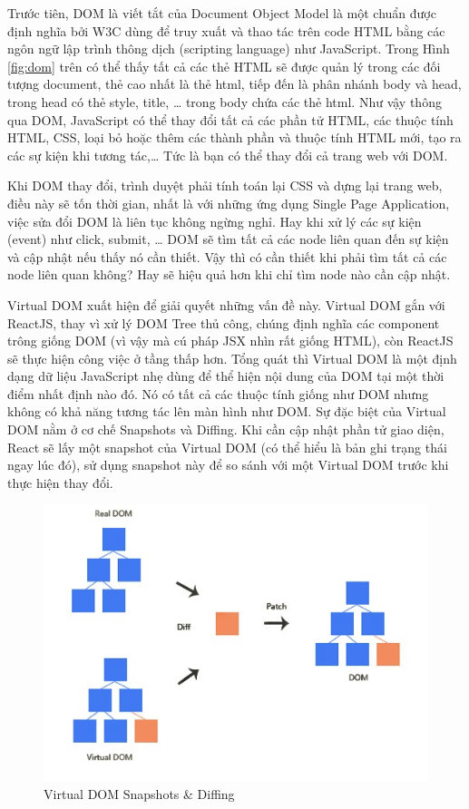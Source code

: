 Trước tiên, DOM là viết tắt của Document Object Model là
một chuẩn được định nghĩa bởi W3C dùng để truy xuất và thao
tác trên code HTML bằng các ngôn ngữ lập trình thông dịch
(scripting language) như JavaScript.
Trong Hình \ref{fig:dom}
trên có thể thấy tất cả các thẻ HTML sẽ được quản lý trong
các đối tượng document, thẻ cao nhất là thẻ html, tiếp đến là
phân nhánh body và head, trong head có thẻ style, title, … trong body
chứa các thẻ html. Như vậy thông qua DOM, JavaScript có thể thay
đổi tất cả các phần tử HTML, các thuộc tính HTML, CSS, loại
bỏ hoặc thêm các thành phần và thuộc tính HTML mới, tạo ra các sự
kiện khi tương tác,… Tức là bạn có thể thay đổi cả trang web với DOM.

Khi DOM thay đổi, trình duyệt phải tính toán lại CSS và dựng lại
trang web, điều này sẽ tốn thời gian, nhất là với những ứng dụng
Single Page Application, việc sửa đổi DOM là liên tục không ngừng
nghỉ. Hay khi xử lý các sự kiện (event) như click, submit, …
DOM sẽ tìm tất cả các node liên quan đến sự kiện và cập nhật nếu
thấy nó cần thiết. Vậy thì có cần thiết khi phải tìm tất
cả các node liên quan không? Hay sẽ hiệu quả hơn khi chỉ tìm
node nào cần cập nhật.

Virtual DOM xuất hiện để giải quyết những vấn đề này.
Virtual DOM gắn với ReactJS, thay vì xử lý DOM Tree thủ công,
chúng định nghĩa các component trông giống DOM
(vì vậy mà cú pháp JSX nhìn rất giống HTML), còn ReactJS sẽ thực
hiện công việc ở tầng thấp hơn. Tổng quát thì Virtual DOM là
một định dạng dữ liệu JavaScript nhẹ dùng để thể hiện nội dung
của DOM tại một thời điểm nhất định nào đó. Nó có tất cả các thuộc
tính giống như DOM nhưng không có khả năng tương tác lên màn hình như
DOM. Sự đặc biệt của Virtual DOM nằm ở cơ chế Snapshots và Diffing.
Khi cần cập nhật phần tử giao diện, React sẽ lấy một snapshot của Virtual
DOM (có thể hiểu là bản ghi trạng thái ngay lúc đó),
sử dụng snapshot này để so sánh với một Virtual DOM trước
khi thực hiện thay đổi.

\begin{figure}[H]
\centering
\includegraphics[width=12cm]{images/virtualdom.jpg}
\caption{Virtual DOM Snapshots \& Diffing}
\label{fig:virtualdom}
\end{figure}

